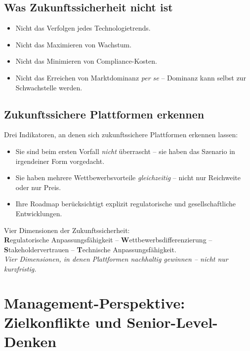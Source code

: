 \documentclass[11pt,a4paper,oneside]{article}
\newcommand{\caveatfontfallback}{\itshape}
\newcommand\caveatfont{\caveatfontfallback}%
\newcommand{\akzent}[1]{{\caveatfont\color{lpAmber}#1}}
\begin{document}
\subsection{Was Zukunftssicherheit nicht ist}

\begin{itemize}
  \item Nicht das Verfolgen jedes Technologietrends.
  \item Nicht das Maximieren von Wachstum.
  \item Nicht das Minimieren von Compliance-Kosten.
  \item Nicht das Erreichen von Marktdominanz \emph{per se} -- Dominanz kann selbst zur Schwachstelle werden.
\end{itemize}

\subsection{Zukunftssichere Plattformen erkennen}

Drei Indikatoren, an denen sich zukunftssichere Plattformen erkennen lassen:

\begin{itemize}
  \item Sie sind beim ersten Vorfall \emph{nicht} überrascht -- sie haben das Szenario in irgendeiner Form vorgedacht.
  \item Sie haben mehrere Wettbewerbsvorteile \emph{gleichzeitig} -- nicht nur Reichweite oder nur Preis.
  \item Ihre Roadmap berücksichtigt explizit regulatorische und gesellschaftliche Entwicklungen.
\end{itemize}

\begin{eselsbox}[Eselsbrücke: \akzent{R-W-S-T}]
Vier Dimensionen der Zukunftssicherheit:\\[2pt]
\textbf{R}egulatorische Anpassungsfähigkeit -- \textbf{W}ettbewerbsdifferenzierung -- \textbf{S}takeholdervertrauen -- \textbf{T}echnische Anpassungsfähigkeit.\\[2pt]
\emph{Vier Dimensionen, in denen Plattformen \emph{nachhaltig} gewinnen -- nicht nur kurzfristig.}
\end{eselsbox}

\section{Management-Perspektive: Zielkonflikte und Senior-Level-Denken}
\end{document}
